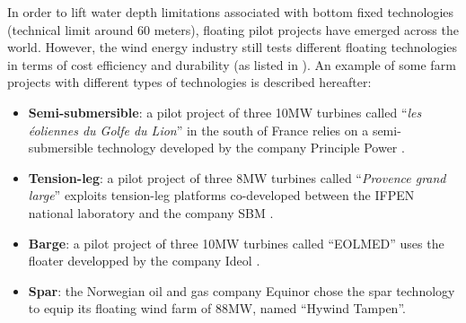 In order to lift water depth limitations associated with bottom fixed technologies (technical limit around 60 meters), floating pilot projects have emerged across the world. 
However, the wind energy industry still tests different floating technologies in terms of cost efficiency and durability (as listed in \citealp{mackinnon_2022_FOWT_table}). 
An example of some farm projects with different types of technologies is described hereafter: 
\begin{itemize}
    \item \textbf{Semi-submersible}: a pilot project of three 10MW turbines called ``\textit{les éoliennes du Golfe du Lion}'' in the south of France relies on a semi-submersible technology developed by the company Principle Power \citep{cermelli_2018_windfloat}.   
    \item \textbf{Tension-leg}: a pilot project of three 8MW turbines called ``\textit{Provence grand large}'' exploits tension-leg platforms co-developed between the IFPEN national laboratory and the company SBM \citep{caille_2017_TPL_IFPEN}. 
    \item \textbf{Barge}: a pilot project of three 10MW turbines called ``EOLMED'' uses the floater developped by the company Ideol \citep{guignier_2016_ideol}. 
    \item \textbf{Spar}: the Norwegian oil and gas company Equinor chose the spar technology \citep{driscoll_2016_hywind} to equip its floating wind farm of 88MW, named ``Hywind Tampen''. 
\end{itemize}

